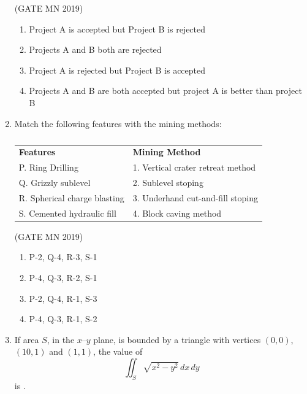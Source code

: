 \documentclass[journal]{IEEEtran}
\begin{document}
\begin{enumerate}
\begin{table}[H]
\caption{}
    \label{tab:Q43}
\end{table}

\hfill(GATE MN 2019)
\begin{enumerate}
\item Project A is accepted but Project B is rejected
\item Projects A and B both are rejected
\item Project A is rejected but Project B is accepted
\item Projects A and B are both accepted but project A is better than project B
\end{enumerate}


\item Match the following features with the mining methods:

  \begin{table}[H]
    \centering\normalsize
\begin{tabular}{| m{6cm} | m{7cm} |}

\textbf{Features} & \textbf{Mining Method} \\

P. Ring Drilling & 1. Vertical crater retreat method \\
Q. Grizzly sublevel & 2. Sublevel stoping \\
R. Spherical charge blasting & 3. Underhand cut-and-fill stoping \\
S. Cemented hydraulic fill & 4. Block caving method \\
\end{tabular}
\caption{}
    \label{tab:Q44}
\end{table}

\hfill(GATE MN 2019)

\begin{multicols}{2}
\begin{enumerate}
\item P-2, Q-4, R-3, S-1
\item P-4, Q-3, R-2, S-1
\item P-2, Q-4, R-1, S-3
\item P-4, Q-3, R-1, S-2
\end{enumerate}
\end{multicols}


\item If area $S$, in the $x$–$y$ plane, is bounded by a triangle with vertices $(0,0)$, $(10,1)$ and $(1,1)$, the value of
\[
\iint_{S} \sqrt{x^2 - y^2} \, dx \, dy
\]
is \underline{\hspace{3cm}}.



\end{enumerate}
\end{document}
